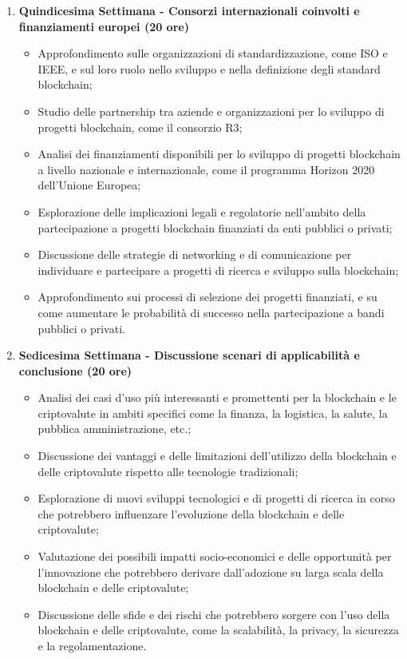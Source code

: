 {\begin{enumerate}
        \item \textbf{Quindicesima Settimana - Consorzi internazionali coinvolti e finanziamenti europei (20 ore)}
        \begin{itemize}
            \item Approfondimento sulle organizzazioni di standardizzazione, come ISO e IEEE, e sul loro ruolo nello sviluppo e nella definizione degli standard blockchain;
            \item Studio delle partnership tra aziende e organizzazioni per lo sviluppo di progetti blockchain, come il consorzio R3;
            \item Analisi dei finanziamenti disponibili per lo sviluppo di progetti blockchain a livello nazionale e internazionale, come il programma Horizon 2020 dell'Unione Europea;
            \item Esplorazione delle implicazioni legali e regolatorie nell'ambito della partecipazione a progetti blockchain finanziati da enti pubblici o privati;
            \item Discussione delle strategie di networking e di comunicazione per individuare e partecipare a progetti di ricerca e sviluppo sulla blockchain;
            \item Approfondimento sui processi di selezione dei progetti finanziati, e su come aumentare le probabilità di successo nella partecipazione a bandi pubblici o privati.
        \end{itemize} 

        \item \textbf{Sedicesima Settimana - Discussione scenari di applicabilità e conclusione (20 ore)}
        \begin{itemize}
            \item Analisi dei casi d'uso più interessanti e promettenti per la blockchain e le criptovalute in ambiti specifici come la finanza, la logistica, la salute, la pubblica amministrazione, etc.;
            \item Discussione dei vantaggi e delle limitazioni dell'utilizzo della blockchain e delle criptovalute rispetto alle tecnologie tradizionali;
            \item Esplorazione di nuovi sviluppi tecnologici e di progetti di ricerca in corso che potrebbero influenzare l'evoluzione della blockchain e delle criptovalute;
            \item Valutazione dei possibili impatti socio-economici e delle opportunità per l'innovazione che potrebbero derivare dall'adozione su larga scala della blockchain e delle criptovalute;
            \item Discussione delle sfide e dei rischi che potrebbero sorgere con l'uso della blockchain e delle criptovalute, come la scalabilità, la privacy, la sicurezza e la regolamentazione.
        \end{itemize} 

    \end{enumerate}

}

